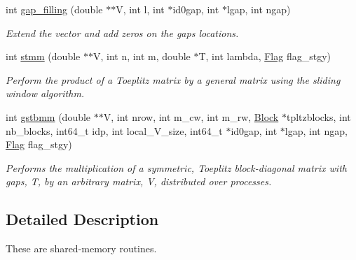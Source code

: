 \begin{DoxyCompactItemize}
int \hyperlink{group__group11_gaf84a476c33acadd1dbfa6e9833e16499}{gap\-\_\-filling} (double $\ast$$\ast$V, int l, int $\ast$id0gap, int $\ast$lgap, int ngap)
\begin{DoxyCompactList}\small\item\em Extend the vector and add zeros on the gaps locations. \end{DoxyCompactList}\item 
int \hyperlink{group__group11_gab2face64bf4e429b38b3ae1a6701cc78}{stmm} (double $\ast$$\ast$V, int n, int m, double $\ast$T, int lambda, \hyperlink{structFlag}{Flag} flag\-\_\-stgy)
\begin{DoxyCompactList}\small\item\em Perform the product of a Toeplitz matrix by a general matrix using the sliding window algorithm. \end{DoxyCompactList}\item 
int \hyperlink{group__group11_ga4cd10fd194db5a77c0366cddeda596ae}{gstbmm} (double $\ast$$\ast$V, int nrow, int m\-\_\-cw, int m\-\_\-rw, \hyperlink{structBlock}{Block} $\ast$tpltzblocks, int nb\-\_\-blocks, int64\-\_\-t idp, int local\-\_\-\-V\-\_\-size, int64\-\_\-t $\ast$id0gap, int $\ast$lgap, int ngap, \hyperlink{structFlag}{Flag} flag\-\_\-stgy)
\begin{DoxyCompactList}\small\item\em Performs the multiplication of a symmetric, Toeplitz block-\/diagonal matrix with gaps, T, by an arbitrary matrix, V, distributed over processes. \end{DoxyCompactList}\end{DoxyCompactItemize}


\subsection{Detailed Description}
These are shared-\/memory routines. 


